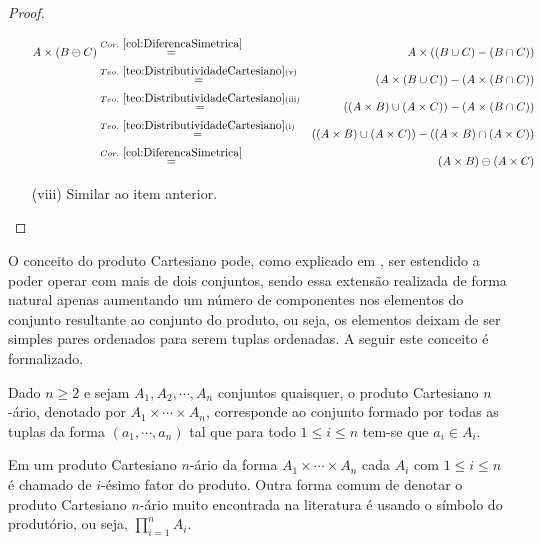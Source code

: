 \begin{proof}
\begin{itemize}
		\begin{eqnarray*}
			A \times (B \ominus C) & \stackrel{Cor. \ \ref{col:DiferencaSimetrica}}{=} & A \times ((B \cup C) - (B \cap C))\\
			& \stackrel{Teo. \ \ref{teo:DistributividadeCartesiano}(\text{v})}{=} & (A \times (B \cup C)) - (A \times (B \cap C))\\
			& \stackrel{Teo. \ \ref{teo:DistributividadeCartesiano}(\text{iii})}{=} & ((A \times B) \cup (A \times C)) - (A \times (B \cap C))\\
			& \stackrel{Teo. \ \ref{teo:DistributividadeCartesiano}(\text{i})}{=} & ((A \times B) \cup (A \times C)) - ((A \times B) \cap (A \times C))\\
			& \stackrel{Cor. \ \ref{col:DiferencaSimetrica}}{=} & (A \times B) \ominus (A \times C)
		\end{eqnarray*}
		\item[(viii)] Similar ao item anterior.
	\end{itemize}
\end{proof}

O conceito do produto Cartesiano pode, como explicado em \cite{lipschutz1978-TC, lipschutz2013-MD}, ser estendido a poder operar com mais de dois conjuntos, sendo essa extensão realizada de forma natural apenas aumentando um número de componentes nos elementos do conjunto resultante ao conjunto do produto, ou seja, os elementos deixam de ser simples pares ordenados para serem tuplas ordenadas. A seguir este conceito é formalizado.

\begin{definition}
	Dado $n \geq 2$ e sejam $A_1, A_2, \cdots, A_n$ conjuntos quaisquer, o produto Cartesiano $n$-ário, denotado por $A_1 \times \cdots \times A_n$, corresponde ao conjunto formado por todas as tuplas da forma $(a_1, \cdots, a_n)$ tal que para todo $1 \leq i \leq n$ tem-se que $a_i \in A_i$.
\end{definition}

Em um produto Cartesiano $n$-ário da forma $A_1 \times \cdots \times A_n$ cada $A_i$ com $1 \leq i \leq n$ é chamado de $i$-ésimo fator do produto. Outra forma comum de denotar o produto Cartesiano $n$-ário muito encontrada na literatura é usando o símbolo do produtório, ou seja, $\displaystyle\prod_{i = 1}^{n} A_i$.

